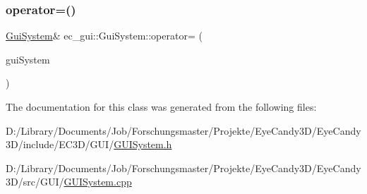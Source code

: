\subsubsection{\texorpdfstring{operator=()}{operator=()}\hspace{0.1cm}{\footnotesize\ttfamily [2/2]}}
{\footnotesize\ttfamily \mbox{\hyperlink{classec__gui_1_1_gui_system}{Gui\+System}}\& ec\+\_\+gui\+::\+Gui\+System\+::operator= (\begin{DoxyParamCaption}\item[{\mbox{\hyperlink{classec__gui_1_1_gui_system}{Gui\+System}} \&\&}]{gui\+System }\end{DoxyParamCaption})\hspace{0.3cm}{\ttfamily [default]}}



The documentation for this class was generated from the following files\+:\begin{DoxyCompactItemize}
\item 
D\+:/\+Library/\+Documents/\+Job/\+Forschungsmaster/\+Projekte/\+Eye\+Candy3\+D/\+Eye\+Candy3\+D/include/\+E\+C3\+D/\+G\+U\+I/\mbox{\hyperlink{_g_u_i_system_8h}{G\+U\+I\+System.\+h}}\item 
D\+:/\+Library/\+Documents/\+Job/\+Forschungsmaster/\+Projekte/\+Eye\+Candy3\+D/\+Eye\+Candy3\+D/src/\+G\+U\+I/\mbox{\hyperlink{_g_u_i_system_8cpp}{G\+U\+I\+System.\+cpp}}\end{DoxyCompactItemize}
